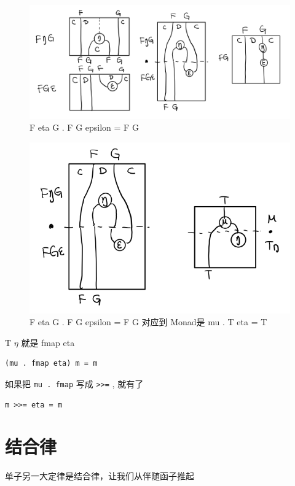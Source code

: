 \documentclass[11pt]{tufte-book}
\begin{document}
\begin{figure}[htbp]
\centering
\includegraphics[width=.9\linewidth]{images/p1-adjunction-functor-triangle-reverse.png}
\caption{F eta G . F G epsilon = F G}
\end{figure}
\begin{figure}[htbp]
\centering
\includegraphics[width=.9\linewidth]{images/p1-monad-triangle-reverse.png}
\caption{F eta G . F G epsilon = F G 对应到 Monad是 mu . T eta = T}
\end{figure}
T \(\eta\) 就是 fmap eta
\begin{verbatim}
(mu . fmap eta) m = m
\end{verbatim}

如果把 \texttt{mu . fmap} 写成 \texttt{>>=} , 就有了

\begin{verbatim}
m >>= eta = m
\end{verbatim}

\section{结合律}
\label{sec:org5e82dc0}

单子另一大定律是结合律，让我们从伴随函子推起
\end{document}
